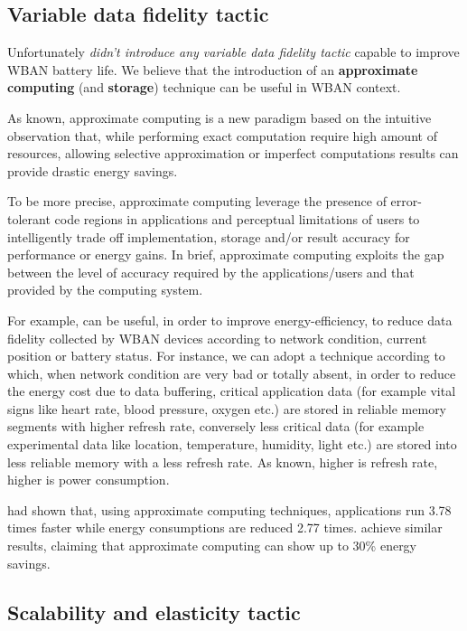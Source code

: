 \documentclass[sigchi]{acmart}
\begin{document}
\subsection{Variable data fidelity tactic}

Unfortunately \citet{MSAReport} \textit{didn't introduce any variable data fidelity tactic} capable to improve WBAN battery life. We believe that the introduction of an \textbf{approximate computing} (and \textbf{storage}) technique can be useful in WBAN context. 

As known, approximate computing is a new paradigm based on the intuitive observation that, while performing exact computation require high amount of resources, allowing selective approximation or imperfect computations results can provide drastic energy savings.

To be more precise, approximate computing leverage the presence of error-tolerant code regions in applications and perceptual limitations of users to intelligently trade off implementation, storage and/or result accuracy for performance or energy gains. In brief, approximate computing exploits the gap between the level of accuracy required by the applications/users and that provided by the computing system.

For example, can be useful, in order to improve energy-efficiency, to reduce data fidelity collected by WBAN devices according to network condition, current position or battery status. For instance, we can adopt a technique according to which, when network condition are very bad or totally absent, in order to reduce the energy cost due to data buffering, critical application data (for example vital signs like heart rate, blood pressure, oxygen etc.) are stored in reliable memory segments with higher refresh rate, conversely less critical data (for example experimental data like location, temperature, humidity, light etc.) are stored into less reliable memory with a less refresh rate. As known, higher is refresh rate, higher is power consumption.\cite{Towards}

\citet{ApproximateComputingArticle} had shown that, using approximate computing techniques, applications run 3.78 times faster while energy consumptions are reduced 2.77 times. \citet{ImpactApproximation} achieve similar results, claiming that approximate computing can show up to 30\% energy savings.

\subsection{Scalability and elasticity tactic}
\end{document}
